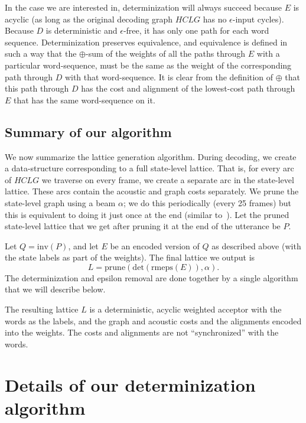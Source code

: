 \documentclass{article}
\def\HCLG{{\mathit{HCLG}}}
\def\inv{{\mathrm{inv}}}
\begin{document}
In the case we are interested in, determinization
will always succeed because $E$ is acyclic (as long as the original decoding
graph $\HCLG$ has no $\epsilon$-input cycles).  Because $D$ is deterministic
and $\epsilon$-free, it has only one path for each word sequence. 
Determinization preserves equivalence,
and equivalence is defined in such a way that the $\oplus$-sum of the
weights of all the paths through $E$ with a particular word-sequence, must be the same
as the weight of the corresponding path through $D$ with that word-sequence.
It is clear from the definition of $\oplus$ that this path through
$D$ has the cost and alignment of the lowest-cost path through $E$ that has the
same word-sequence on it.  

\subsection{Summary of our algorithm}

We now summarize the lattice generation algorithm.  During decoding, we create a data-structure
corresponding to a full state-level lattice.  That is, for every arc of $\HCLG$ we traverse
on every frame, we create a separate arc in the state-level lattice.  These arcs
contain the acoustic and graph costs separately.  We prune the state-level graph using
a beam $\alpha$; we do this periodically (every 25 frames) but this is equivalent to
doing it just once at the end (similar to~\cite{efficient_general}).  Let the pruned
state-level lattice that we get after pruning it at the end of the utterance be $P$.

Let $Q = \inv(P)$, and let $E$ be an encoded version of $Q$ as described above (with the
state labels as part of the weights).  The final lattice we output is
\begin{equation}
   L = \mathrm{prune}(\mathrm{det}(\mathrm{rmeps}(E)), \alpha) .
\end{equation}
The determinization and epsilon removal are done together by a single algorithm
that we will describe below.

The resulting lattice $L$ is a deterministic, acyclic weighted acceptor with the 
words as the labels, and the graph and acoustic costs and the alignments
encoded into the weights.  The costs and alignments are not ``synchronized'' 
with the words.

\section{Details of our determinization algorithm}
\label{sec:details}
\end{document}
